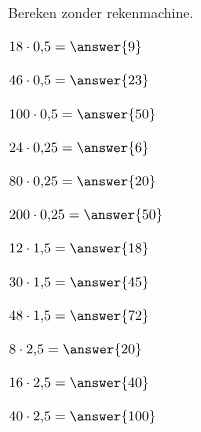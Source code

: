 \documentclass{ximera}
\begin{document}
\begin{oefening}{\oefB\ESS}

Bereken zonder rekenmachine.

\begin{question} \(18\cdot0{,}5=\answer{9}\) \end{question}

\begin{question} \(46\cdot0{,}5=\answer{23}\) \end{question}

\begin{question} \(100\cdot0{,}5=\answer{50}\) \end{question}

\begin{question} \(24\cdot0{,}25=\answer{6}\) \end{question}

\begin{question} \(80\cdot0{,}25=\answer{20}\) \end{question}

\begin{question} \(200\cdot0{,}25=\answer{50}\) \end{question}

\begin{question} \(12\cdot1{,}5=\answer{18}\) \end{question}

\begin{question} \(30\cdot1{,}5=\answer{45}\) \end{question}

\begin{question} \(48\cdot1{,}5=\answer{72}\) \end{question}

\begin{question} \(8\cdot2{,}5=\answer{20}\) \end{question}

\begin{question} \(16\cdot2{,}5=\answer{40}\) \end{question}

\begin{question} \(40\cdot2{,}5=\answer{100}\) \end{question}

\end{oefening}


\end{document}
